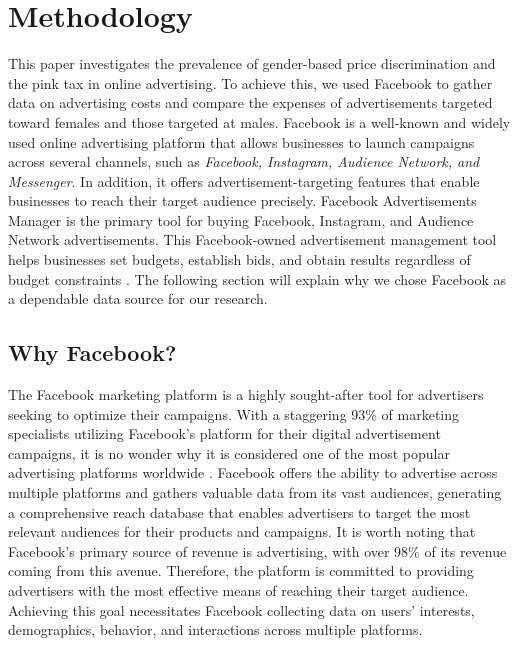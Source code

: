 \documentclass[twocolumn]{bmcart}\usepackage{lineno}
\begin{document}
\section{Methodology}
This paper investigates the prevalence of gender-based price discrimination and the pink tax in online advertising. To achieve this, we used Facebook to gather data on advertising costs and compare the expenses of advertisements targeted toward females and those targeted at males. Facebook is a well-known and widely used online advertising platform that allows businesses to launch campaigns across several channels, such as \emph{Facebook, Instagram, Audience Network, and Messenger}. In addition, it offers advertisement-targeting features that enable businesses to reach their target audience precisely. Facebook Advertisements Manager is the primary tool for buying Facebook, Instagram, and Audience Network advertisements. This Facebook-owned advertisement management tool helps businesses set budgets, establish bids, and obtain results regardless of budget constraints \cite{facebook_business}. The following section will explain why we chose Facebook as a dependable data source for our research.
\subsection{Why Facebook?}
The Facebook marketing platform is a highly sought-after tool for advertisers seeking to optimize their campaigns. With a staggering 93\% of marketing specialists utilizing Facebook's platform for their digital advertisement campaigns, it is no wonder why it is considered one of the most popular advertising platforms worldwide \cite{FBStat}. Facebook offers the ability to advertise across multiple platforms and gathers valuable data from its vast audiences, generating a comprehensive reach database that enables advertisers to target the most relevant audiences for their products and campaigns. It is worth noting that Facebook's primary source of revenue is advertising, with over 98\% of its revenue coming from this avenue. Therefore, the platform is committed to providing advertisers with the most effective means of reaching their target audience. Achieving this goal necessitates Facebook collecting data on users' interests, demographics, behavior, and interactions across multiple platforms\cite{fb-revenue}.
\end{document}
